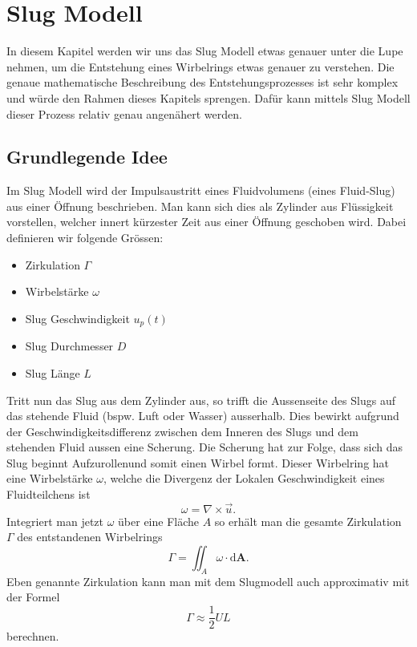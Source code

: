 \section{Slug Modell}
In diesem Kapitel werden wir uns das Slug Modell etwas genauer unter die Lupe nehmen, um die Entstehung eines Wirbelrings etwas genauer zu verstehen.
Die genaue mathematische Beschreibung des Entstehungsprozesses ist sehr komplex und würde den Rahmen dieses Kapitels sprengen.
Dafür kann mittels Slug Modell dieser Prozess relativ genau angenähert werden.

\subsection{Grundlegende Idee}
Im Slug Modell wird der Impulsaustritt eines Fluidvolumens (eines Fluid-Slug) aus einer Öffnung beschrieben.
Man kann sich dies als Zylinder aus Flüssigkeit vorstellen, welcher innert kürzester Zeit aus einer Öffnung geschoben wird.
Dabei definieren wir folgende Grössen:
\begin{itemize}
    \item Zirkulation $\Gamma$
    \item Wirbelstärke $\omega$
    \item Slug Geschwindigkeit $u_p(t)$
    \item Slug Durchmesser $D$
    \item Slug Länge $L$
\end{itemize}
Tritt nun das Slug aus dem Zylinder aus, so trifft die Aussenseite des Slugs auf das stehende Fluid (bspw. Luft oder Wasser) ausserhalb.
Dies bewirkt aufgrund der Geschwindigkeitsdifferenz zwischen dem Inneren des Slugs und dem stehenden Fluid aussen eine Scherung.
Die Scherung hat zur Folge, dass sich das Slug beginnt \glqq Aufzurollen\grqq und somit einen Wirbel formt. 
Dieser Wirbelring hat eine Wirbelstärke $\omega$, welche die Divergenz der Lokalen Geschwindigkeit eines Fluidteilchens ist
\[
\omega = \nabla \times \vec{u}.
\]
Integriert man jetzt $\omega$ über eine Fläche $A$ so erhält man die gesamte Zirkulation $\Gamma$ des entstandenen Wirbelrings
\[
\Gamma = \iint_{A} \omega\cdot\mathrm{d}\mathbf{A}.
\]
Eben genannte Zirkulation kann man mit dem Slugmodell auch approximativ mit der Formel
\[
\Gamma \approx \frac{1}{2}UL
\]
berechnen.